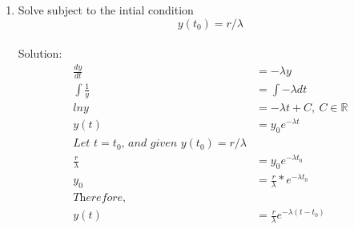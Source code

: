 \documentclass{article}
\begin{document}
\begin{enumerate}
\begin{enumerate}
		\item Solve subject to the intial condition
		\begin{equation*}
			y(t_0) = r / \lambda
		\end{equation*}
		\\ Solution:
		\begin{align*}
			\frac{dy}{dt} &= -\lambda y \\
			\int \frac{1}{y} &= \int -\lambda dt \\
			ln{y} &= -\lambda t + C,\ C\in\mathbb{R} \\
			y(t) &= y_0 e^{-\lambda t} \\
			\textit{Let $t = t_0$, and given $y(t_0) = r / \lambda$} \\
			\frac{r}{\lambda} &= y_0 e^{-\lambda t_0} \\
			y_0 &= \frac{r}{\lambda} * e^{-\lambda t_0} \\
			\textit{Therefore, } \\
			y(t) &= \frac{r}{\lambda} e^{-\lambda(t - t_0)}
		\end{align*}
	

\end{enumerate}
\end{enumerate}
\end{document}
